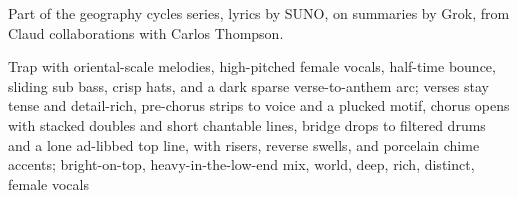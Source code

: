 
\begin{notes}
Part of the geography cycles series, lyrics by SUNO, on summaries by Grok, from Claud collaborations with Carlos Thompson.
\end{notes}
\begin{style}
Trap with oriental-scale melodies, high-pitched female vocals, half-time bounce, sliding sub bass, crisp hats, and a dark sparse verse-to-anthem arc; verses stay tense and detail-rich, pre-chorus strips to voice and a plucked motif, chorus opens with stacked doubles and short chantable lines, bridge drops to filtered drums and a lone ad-libbed top line, with risers, reverse swells, and porcelain chime accents; bright-on-top, heavy-in-the-low-end mix, world, deep, rich, distinct, female vocals
\end{style}
